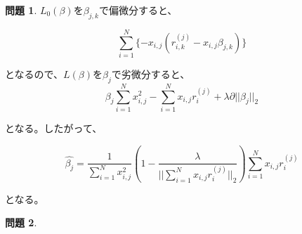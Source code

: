 \documentclass[titlepage]{jsarticle}
\theoremstyle{definition}
\newtheorem{Ex}{問題}
\theoremstyle{mystyle} %
\begin{document}
\begin{Ex}
$L_0(\beta)$を$\beta_{j,k}$で偏微分すると、

\begin{equation*}
\sum_{i=1}^{N}\{-x_{i, j}(r^{(j)}_{i,k}-x_{i,j}\beta_{j,k})\}
\end{equation*}

となるので、$L(\beta)$を$\beta_j$で劣微分すると、
\begin{equation*}
\beta_j\sum_{i=1}^{N}x_{i,j}^2-\sum_{i=1}^{N}x_{i,j}r_i^{(j)}+\lambda\partial||\beta_j||_2
\end{equation*}

となる。したがって、

\begin{equation*}
\hat{\beta_j}=\frac{1}{\sum_{i=1}^{N}x_{i,j}^2}(1-\frac{\lambda}{||\sum_{i=1}^{N}x_{i,j}r_i^{(j)}||_2})\sum_{i=1}^{N}x_{i,j}r_i^{(j)}
\end{equation*}

となる。

\end{Ex}
\begin{Ex}

\end{Ex}
\end{document}
